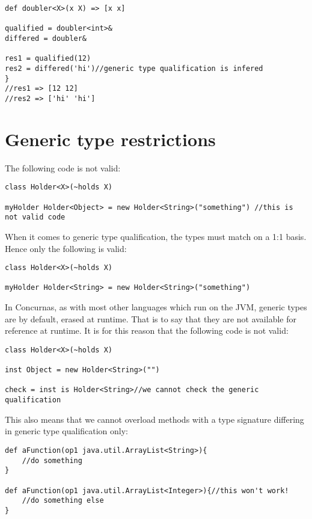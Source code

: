\documentclass[conc-doc]{subfiles}
\begin{document}
\begin{lstlisting}
def doubler<X>(x X) => [x x]

qualified = doubler<int>&
differed = doubler&

res1 = qualified(12)
res2 = differed('hi')//generic type qualification is infered
}
//res1 => [12 12]
//res2 => ['hi' 'hi']
\end{lstlisting}

\section{Generic type restrictions}
The following code is not valid:

\begin{lstlisting}
class Holder<X>(~holds X)

myHolder Holder<Object> = new Holder<String>("something") //this is not valid code
\end{lstlisting}

When it comes to generic type qualification, the types must match on a 1:1 basis. Hence only the following is valid:

\begin{lstlisting}
class Holder<X>(~holds X)

myHolder Holder<String> = new Holder<String>("something")
\end{lstlisting}

In Concurnas, as with most other languages which run on the JVM, generic types are by default, erased at runtime. That is to say that they are not available for reference at runtime. It is for this reason that the following code is not valid:

\begin{lstlisting}
class Holder<X>(~holds X)

inst Object = new Holder<String>("")

check = inst is Holder<String>//we cannot check the generic qualification
\end{lstlisting}

This also means that we cannot overload methods with a type signature differing in generic type qualification only:

\begin{lstlisting}
def aFunction(op1 java.util.ArrayList<String>){
	//do something
}

def aFunction(op1 java.util.ArrayList<Integer>){//this won't work!
	//do something else
}
\end{lstlisting}
\end{document}
